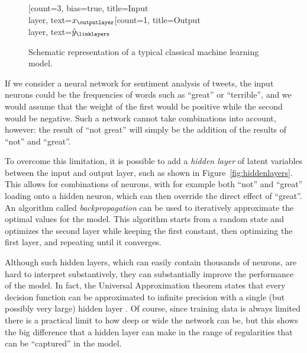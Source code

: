 \begin{figure}
  \centering
 \begin{neuralnetwork}[height=4]
        \newcommand{\x}[2]{$x_#2$}
        \newcommand{\y}[2]{$\hat{y}_#2$}
        [count=3, bias=true, title=Input\\layer, text=\x]
        \outputlayer[count=1, title=Output\\layer, text=\y] \linklayers
 \end{neuralnetwork}
\caption{Schematic representation of a typical classical machine learning model. \label{fig:perceptron}}
\end{figure}

If we consider a neural network for sentiment analysis of tweets,
the input neurons could be the frequencies of words such as ``great'' or ``terrible'',
and we would assume that the weight of the first would be positive while the second would be negative.
Such a network cannot take combinations into account, however:
the result of ``not great'' will simply be the addition of the results of ``not'' and ``great''.

To overcome this limitation, it is possible to add a \emph{hidden layer} of latent variables
between the input and output layer, such as shown in Figure~\ref{fig:hiddenlayers}.
This allows for combinations of neurons, with for example both ``not'' and 	``great'' loading onto a hidden neuron,
which can then override the direct effect of ``great''.
An algorithm called \emph{backpropagation} can be used to iteratively approximate the optimal values for the model.
This algorithm starts from a random state and optimizes the second layer while keeping the first constant,
then optimizing the first layer, and repeating until it converges.

Although such hidden layers, which can easily contain thousands of neurons, are hard to interpret substantively,
they can substantially improve the performance of the model.
In fact, the Universal Approximation theorem states that every decision function can be approximated to infinite precision
with a single (but possibly very large) hidden layer \citet{goldberg2017}.
Of course, since training data is always limited there is a practical limit to how deep or wide the network can be,
but this shows the big difference that a hidden layer can make in the range of regularities that can be ``captured'' in the model.


